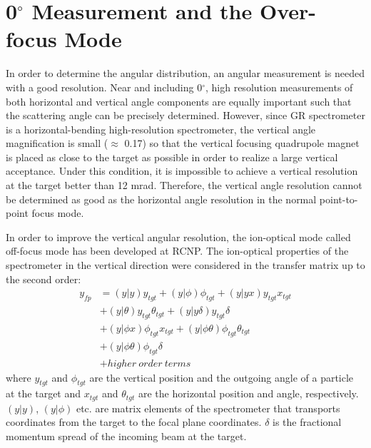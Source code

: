 \section{0$^{\circ}$ Measurement and the Over-focus Mode}
In order to determine the angular distribution, an angular measurement is needed with a good resolution. Near and including 0$^{\circ}$, high resolution measurements of both horizontal and vertical angle components  are equally important such that the scattering angle can be precisely determined. However, since GR spectrometer is a horizontal-bending high-resolution spectrometer, the vertical angle magnification is small ($\approx$ 0.17)  so that the vertical focusing quadrupole magnet is placed as close to the target as possible in order to realize a large vertical acceptance.
Under this condition, it is impossible to achieve a vertical resolution at the target better than 12 mrad. Therefore, the vertical angle resolution cannot be determined as good as the horizontal angle resolution in the normal point-to-point focus mode.

In order to improve the vertical angular resolution, the ion-optical mode called off-focus mode has been developed at RCNP.  The ion-optical properties of the spectrometer in the vertical direction were considered in the transfer matrix up to the second order:
 \begin{equation}
    \label{eq:y_fp}
    \begin{aligned}
        y_{fp} &= (y|y)y_{tgt}+(y|\phi)\phi_{tgt} + (y|yx)y_{tgt}x_{tgt} \\
               &+ (y|\theta)y_{tgt}\theta_{tgt} + (y|y\delta)y_{tgt}\delta \\
               &+ (y|\phi x)\phi_{tgt} x_{tgt} + (y|\phi \theta) \phi_{tgt} \theta_{tgt} \\
               &+ (y|\phi \theta) \phi_{tgt} \delta           \\
               &+higher \ order \ terms
    \end{aligned}
\end{equation}
where $y_{tgt}$ and $\phi_{tgt}$ are the vertical position and the outgoing angle of a particle at the target and $x_{tgt}$ and $\theta_{tgt}$ are the horizontal position and angle, respectively. $(y|y)$, $(y|\phi)$ etc. are matrix elements of the spectrometer  that transports coordinates from the target to the focal plane coordinates.  $\delta$ is the fractional momentum spread of the incoming beam at the target.


